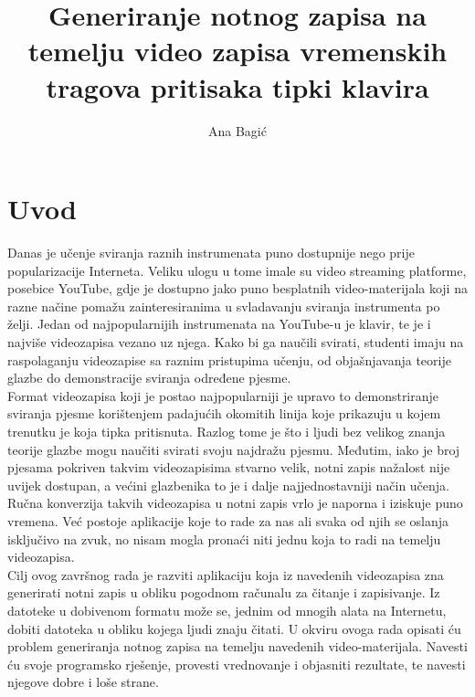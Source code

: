 \documentclass[times, utf8, zavrsni, numeric]{fer}
\begin{document}

\title{Generiranje notnog zapisa na temelju video zapisa vremenskih tragova
	pritisaka tipki klavira
}

\author{Ana Bagić}

\maketitle

\izvornik

\zahvala{}

\tableofcontents

\chapter{Uvod}
Danas je učenje sviranja raznih instrumenata puno dostupnije nego prije popularizacije Interneta. Veliku ulogu u tome imale su video streaming platforme, posebice YouTube, gdje je dostupno jako puno besplatnih video-materijala koji na razne načine pomažu zainteresiranima u svladavanju sviranja instrumenta po želji. Jedan od najpopularnijih instrumenata na YouTube-u je klavir, te je i najviše videozapisa vezano uz njega. Kako bi ga naučili svirati, studenti imaju na raspolaganju videozapise sa raznim pristupima učenju, od objašnjavanja teorije glazbe do demonstracije sviranja određene pjesme.\\

Format videozapisa koji je postao najpopularniji je upravo to demonstriranje sviranja pjesme korištenjem padajućih okomitih linija koje prikazuju u kojem trenutku je koja tipka pritisnuta. Razlog tome je što i ljudi bez velikog znanja teorije glazbe mogu naučiti svirati svoju najdražu pjesmu. Međutim, iako je broj pjesama pokriven takvim videozapisima stvarno velik, notni zapis nažalost nije uvijek dostupan, a većini glazbenika to je i dalje najjednostavniji način učenja. Ručna konverzija takvih videozapisa u notni zapis vrlo je naporna i iziskuje puno vremena. Već postoje aplikacije koje to rade za nas ali svaka od njih se oslanja isključivo na zvuk, no nisam mogla pronaći niti jednu koja to radi na temelju videozapisa.\\

Cilj ovog završnog rada je razviti aplikaciju koja iz navedenih videozapisa zna generirati notni zapis u obliku pogodnom računalu za čitanje i zapisivanje. Iz datoteke u dobivenom formatu može se, jednim od mnogih alata na Internetu, dobiti datoteka u obliku kojega ljudi znaju čitati. U okviru ovoga rada opisati ću problem generiranja notnog zapisa na temelju navedenih video-materijala. Navesti ću svoje programsko rješenje, provesti vrednovanje i objasniti rezultate, te navesti njegove dobre i loše strane.
\end{document}
